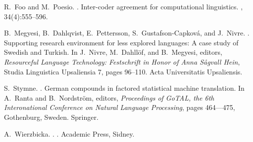 
% 

\begin{thebibliography}{}

R.~Foo and M.~Poesio.
.
\newblock Inter-coder agreement for computational linguistics.
, 34(4):555--596.

B.~Megyesi, B.~Dahlqvist, E.~Pettersson, S.~Gustafson-Capkov\'a, and J.~Nivre.
.
\newblock Supporting research environment for less explored languages: A case
  study of {S}wedish and {T}urkish.
\newblock In J.~Nivre, M.~Dahll\"of, and B.~Megyesi, editors, {\em Resourceful
  Language Technology: Festschrift in Honor of Anna S\aa{}gvall Hein}, Studia
  Linguistica Upsaliensia 7, pages 96--110. Acta Universitatis Upsaliensis.

S.~Stymne.
.
\newblock German compounds in factored statistical machine translation.
\newblock In A.~Ranta and B.~Nordstr\"om, editors, {\em Proceedings of GoTAL,
  the 6th Interonational Conference on Natural Language Processing}, pages
  464–--475, Gothenburg, Sweden. Springer.

A.~Wierzbicka.
.
.
\newblock Academic Press, Sidney.

\end{thebibliography}